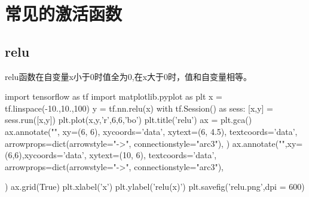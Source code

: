 \section{常见的激活函数}
\subsection{relu}
relu函数在自变量x小于0时值全为0,在x大于0时，值和自变量相等。
\begin{python}
import tensorflow as tf 
import matplotlib.pyplot as plt 
x = tf.linspace(-10.,10.,100)
y = tf.nn.relu(x)
with tf.Session() as sess:
	[x,y] = sess.run([x,y])
plt.plot(x,y,'r',6,6,'bo')
plt.title('relu')
ax = plt.gca()
ax.annotate("",
            xy=(6, 6), xycoords='data',
            xytext=(6, 4.5), textcoords='data',
            arrowprops=dict(arrowstyle="->",
                            connectionstyle="arc3"),
            )
ax.annotate("",xy=(6,6),xycoords='data',
            xytext=(10, 6), textcoords='data',
            arrowprops=dict(arrowstyle="->",
                            connectionstyle="arc3"),
	  	   
)
ax.grid(True)
plt.xlabel('x')
plt.ylabel('relu(x)')
plt.savefig('relu.png',dpi = 600)
\end{python}
